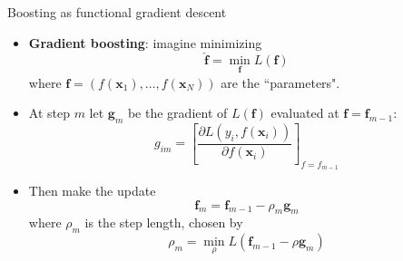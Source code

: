 \documentclass[10pt,mathserif]{beamer}
\begin{document}
\begin{frame}{Boosting as functional gradient descent}
\begin{itemize}
    \item \textbf{Gradient boosting}: imagine minimizing
    \begin{equation*}
        \hat{\bm{f}} = \min_{\bm{f}} L(\bm{f})
    \end{equation*}
    where $\bm{f} = (f(\bm{x}_1 ),\ldots, f(\bm{x}_N))$ are the ``parameters". 
    \item At step $m$ let $\bm{g}_m$ be the gradient of $L(\bm{f})$ evaluated at $\bm{f} = \bm{f}_{m-1}$:
    \begin{equation*}
        g_{im}  = [\frac{\partial L(y_i, f(\bm{x}_i))}{\partial f(\bm{x}_i)}]_{f = f_{m-1}}
    \end{equation*}
    \item Then make the update
    \begin{equation*}
        \bm{f}_m = \bm{f}_{m-1} - \rho_m \bm{g}_m
    \end{equation*}
    where $\rho_m$ is the step length, chosen by
    \begin{equation*}
        \rho_m = \min_\rho L(\bm{f}_{m-1} - \rho \bm{g}_m)
    \end{equation*}
\end{itemize}
\end{frame}
\end{document}

